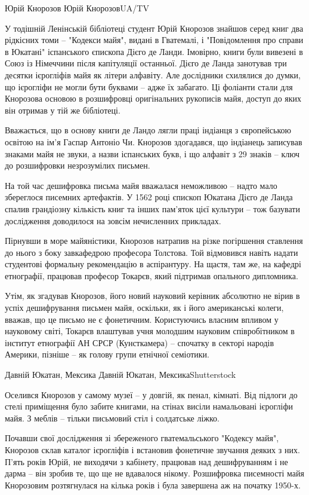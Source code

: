 Юрій Кнорозов  Юрій КнорозовUA/TV

У тодішній Ленінській бібліотеці студент Юрій Кнорозов знайшов серед книг
два рідкісних томи – "Кодекси майя", видані в Гватемалі, і "Повідомлення
про справи в Юкатані" іспанського єпископа Дієго де Ланди. Імовірно, книги
були вивезені в Союз із Німеччини після капітуляції останньої. Дієго де
Ланда занотував три десятки ієрогліфів майя як літери алфавіту. Але
дослідники схилялися до думки, що ієрогліфи не могли бути буквами – адже
їх забагато. Ці фоліанти стали для Кнорозова основою в розшифровці
оригінальних рукописів майя, доступ до яких він отримав у тій же
бібліотеці.

Вважається, що в основу книги де Ландо лягли праці індіанця з
європейською освітою на ім'я Гаспар Антоніо Чи. Кнорозов здогадався, що
індіанець записував знаками майя не звуки, а назви іспанських букв, і що
алфавіт з 29 знаків – ключ до розшифровки незрозумілих письмен.

На той час дешифровка письма майя вважалася неможливою – надто мало
збереглося писемних артефактів. У 1562 році єпископ Юкатана Дієго де Ланда
спалив грандіозну кількість книг та інших пам'яток цієї культури – тож
базувати дослідження доводилося на зовсім нечисленних прикладах.

Пірнувши в море майяністики, Кнорозов натрапив на різке погіршення
ставлення до нього з боку завкафедрою професора Толстова. Той відмовився
навіть надати студентові формальну рекомендацію в аспірантуру. На щастя,
там же, на кафедрі етнографії, працював професор Токарєв, який підтримав
опального дипломника.

Утім, як згадував Кнорозов, його новий науковий керівник абсолютно не
вірив в успіх дешифрування письмен майя, оскільки, як і його американські
колеги, вважав, що це письмо не є фонетичним. Користуючись власним впливом
у науковому світі, Токарєв влаштував учня молодшим науковим співробітником
в інститут етнографії АН СРСР (Кунсткамера) – спочатку в секторі народів
Америки, пізніше – як голову групи етнічної семіотики.

Давній Юкатан, Мексика  Давній Юкатан, МексикаShutterstock

Оселився Кнорозов у самому музеї – у довгій, як пенал, кімнаті. Від
підлоги до стелі приміщення було забите книгами, на стінах висіли
намальовані ієрогліфи майя. З меблів – тільки письмовий стіл і
солдатське ліжко.

Почавши свої дослідження зі збереженого гватемальського "Кодексу майя",
Кнорозов склав каталог ієрогліфів і встановив фонетичне звучання деяких з
них. П'ять років Юрій, не виходячи з кабінету, працював над дешифруванням
і не дарма – він зробив те, що ще не вдавалося нікому. Розшифровка
писемності майя Кнорозовим розтягнулася на кілька років і була завершена
аж на початку 1950-х.

